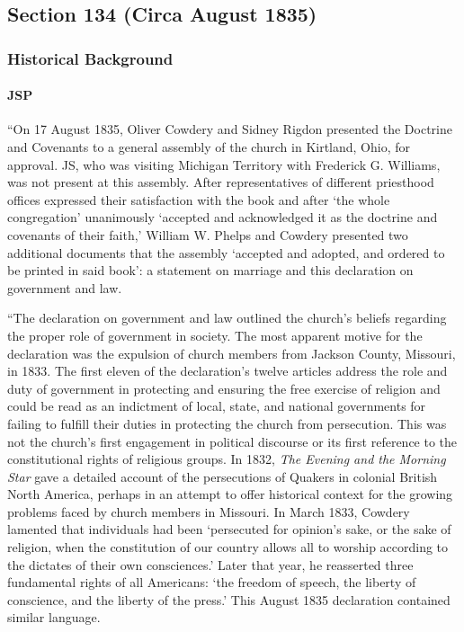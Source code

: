 \subsection{Section 134 (Circa August 1835)}
	\label{DC134}
	
	\subsubsection{Historical Background}
		\label{DC134-HB}
		
		\paragraph{JSP}
		
			``On 17 August 1835, Oliver Cowdery and Sidney Rigdon presented the Doctrine and Covenants to a general assembly of the church in Kirtland, Ohio, for approval. JS, who was visiting Michigan Territory with Frederick G. Williams, was not present at this assembly. After representatives of different priesthood offices expressed their satisfaction with the book and after `the whole congregation' unanimously `accepted and acknowledged it as the doctrine and covenants of their faith,' William W. Phelps and Cowdery presented two additional documents that the assembly `accepted and adopted, and ordered to be printed in said book': a statement on marriage and this declaration on government and law.

			``The declaration on government and law outlined the church's beliefs regarding the proper role of government in society. The most apparent motive for the declaration was the expulsion of church members from Jackson County, Missouri, in 1833. The first eleven of the declaration's twelve articles address the role and duty of government in protecting and ensuring the free exercise of religion and could be read as an indictment of local, state, and national governments for failing to fulfill their duties in protecting the church from persecution. This was not the church's first engagement in political discourse or its first reference to the constitutional rights of religious groups. In 1832, \textit{The Evening and the Morning Star} gave a detailed account of the persecutions of Quakers in colonial British North America, perhaps in an attempt to offer historical context for the growing problems faced by church members in Missouri. In March 1833, Cowdery lamented that individuals had been `persecuted for opinion's sake, or the sake of religion, when the constitution of our country allows all to worship according to the dictates of their own consciences.' Later that year, he reasserted three fundamental rights of all Americans: `the freedom of speech, the liberty of conscience, and the liberty of the press.' This August 1835 declaration contained similar language.

